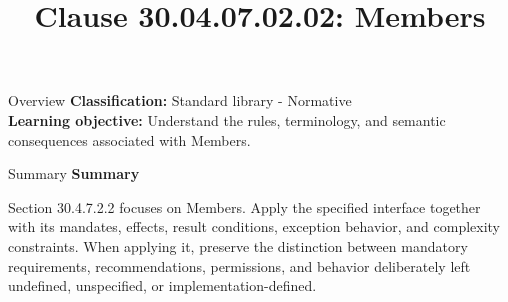 \documentclass[10pt,letterpaper]{article}
\title{Clause 30.04.07.02.02: Members}
\author{}
\date{}
\begin{document}
\maketitle
\begin{CornellOverviewBox}{Overview}
\textbf{Classification:} Standard library - Normative\\[2pt]
\textbf{Learning objective:} Understand the rules, terminology, and semantic consequences associated with Members.
\end{CornellOverviewBox}\begin{CornellSummaryBox}{Summary}
{\sffamily\bfseries\color{Accent} Summary}\par\vspace{3pt}Section 30.4.7.2.2 focuses on Members. Apply the specified interface together with its mandates, effects, result conditions, exception behavior, and complexity constraints. When applying it, preserve the distinction between mandatory requirements, recommendations, permissions, and behavior deliberately left undefined, unspecified, or implementation-defined.
\end{CornellSummaryBox}
\end{document}
